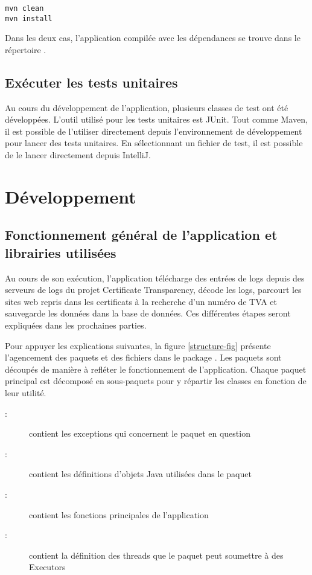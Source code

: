\documentclass{article}
\begin{document}
\begin{verbatim}
mvn clean
mvn install
\end{verbatim}

Dans les deux cas, l'application compilée avec les dépendances se trouve dans le répertoire .


\subsection{Exécuter les tests unitaires}

Au cours du développement de l'application, plusieurs classes de test ont été développées.  L'outil utilisé pour les tests unitaires est JUnit.  Tout comme Maven, il est possible de l'utiliser directement depuis l'environnement de développement pour lancer des tests unitaires.  En sélectionnant un fichier de test, il est possible de le lancer directement depuis IntelliJ.  


\section{Développement}

\subsection{Fonctionnement général de l'application et librairies utilisées}

Au cours de son exécution, l'application télécharge des entrées de logs depuis des serveurs de logs du projet Certificate Transparency, décode les logs, parcourt les sites web repris dans les certificats à la recherche d'un numéro de TVA et sauvegarde les données dans la base de données.  Ces différentes étapes seront expliquées dans les prochaines parties.

Pour appuyer les explications suivantes, la figure \ref{structure-fig} présente l'agencement des paquets et des fichiers dans le package .  Les paquets sont découpés de manière à refléter le fonctionnement de l'application.  Chaque paquet principal est décomposé en sous-paquets pour y répartir les classes en fonction de leur utilité.

\begin{description}
    \item[:] contient les exceptions qui concernent le paquet en question
    \item[:] contient les définitions d'objets Java utilisées dans le paquet
    \item[:] contient les fonctions principales de l'application
    \item[:] contient la définition des threads que le paquet peut soumettre à des Executors
\end{description}
\end{document}
